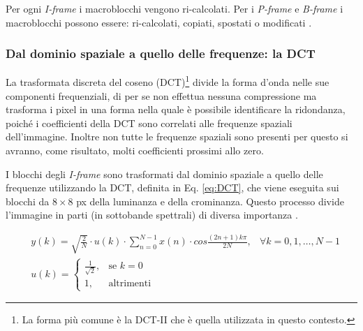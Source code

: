 Per ogni \textit{I-frame} i macroblocchi vengono ri-calcolati. Per i \textit{P-frame} e \textit{B-frame} i macroblocchi possono essere: ri-calcolati, copiati, spostati o modificati \parencite{MPEG_1_Video}.



\subsubsection{Dal dominio spaziale a quello delle frequenze: la DCT}
La trasformata discreta del coseno (DCT)\footnote{La forma più comune è la DCT-II che è quella utilizzata in questo contesto.} divide la forma d'onda nelle sue componenti frequenziali, di per se non effettua nessuna compressione ma trasforma i pixel in una forma nella quale è possibile identificare la ridondanza, poiché i coefficienti della DCT sono correlati alle frequenze spaziali dell'immagine. Inoltre non tutte le frequenze spaziali sono presenti per questo si avranno, come risultato, molti coefficienti prossimi allo zero.

I blocchi degli \textit{I-frame} sono trasformati dal dominio spaziale a quello delle frequenze utilizzando la DCT, definita in Eq. \ref{eq:DCT}, che viene eseguita sui blocchi da $8\times8$ px della luminanza e della crominanza. Questo processo divide l'immagine in parti (in sottobande spettrali) di diversa importanza \parencite{HyesookLim2000Asaf}.

\begin{equation} \label{eq:DCT}
	\begin{aligned}
		& y(k) = \sqrt{\frac{2}{N}} \cdot u(k) \cdot \sum_{n=0}^{N-1} x(n) \cdot cos \frac{(2n+1)k\pi}{2N}, & \forall k = 0, 1, \dots, N-1\\
		& u(k) =
		\begin{cases}
			\frac{1}{\sqrt{2}},	& \text{se } k=0\\
			1,					& \text{altrimenti}
		\end{cases}
	\end{aligned}
\end{equation}




